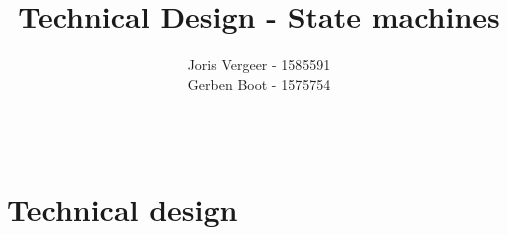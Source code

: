 \documentclass[12pt,a4paper]{report}
\title{
Technical Design - State machines
}
\author{
Joris Vergeer - 1585591\\
Gerben Boot - 1575754\\
\\
\\
}
\begin{document}
\maketitle

\chapter{Technical design}


\end{document}
